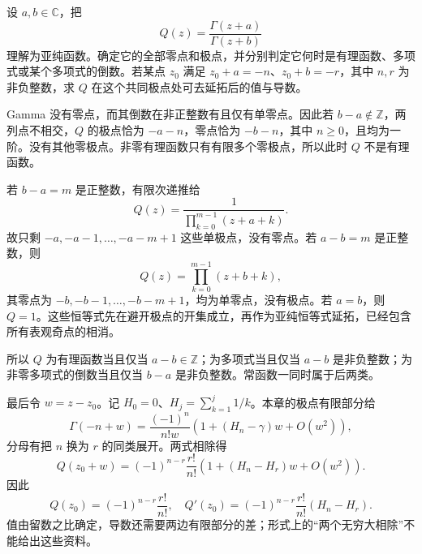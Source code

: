 \begin{exercise}\label{b3:ex:21-3}
设 \(a,b\in\mathbb C\)，把
\[
 Q(z)=\frac{\Gamma(z+a)}{\Gamma(z+b)}
\]
理解为亚纯函数。确定它的全部零点和极点，并分别判定它何时是有理函数、多项式或某个多项式的倒数。若某点 \(z_0\) 满足
\(z_0+a=-n\)、\(z_0+b=-r\)，其中 \(n,r\) 为非负整数，求 \(Q\) 在这个共同极点处可去延拓后的值与导数。
\end{exercise}
\begin{solution}
Gamma 没有零点，而其倒数在非正整数有且仅有单零点。因此若 \(b-a\notin\mathbb Z\)，两列点不相交，\(Q\) 的极点恰为 \(-a-n\)，零点恰为 \(-b-n\)，其中 \(n\ge0\)，且均为一阶。没有其他零极点。非零有理函数只有有限多个零极点，所以此时 \(Q\) 不是有理函数。

若 \(b-a=m\) 是正整数，有限次递推给
\[
 Q(z)=\frac1{\prod_{k=0}^{m-1}(z+a+k)}.
\]
故只剩 \(-a,-a-1,\ldots,-a-m+1\) 这些单极点，没有零点。若 \(a-b=m\) 是正整数，则
\[
 Q(z)=\prod_{k=0}^{m-1}(z+b+k),
\]
其零点为 \(-b,-b-1,\ldots,-b-m+1\)，均为单零点，没有极点。若 \(a=b\)，则 \(Q=1\)。这些恒等式先在避开极点的开集成立，再作为亚纯恒等式延拓，已经包含所有表观奇点的相消。

所以 \(Q\) 为有理函数当且仅当 \(a-b\in\mathbb Z\)；为多项式当且仅当 \(a-b\) 是非负整数；为非零多项式的倒数当且仅当 \(b-a\) 是非负整数。常函数一同时属于后两类。

最后令 \(w=z-z_0\)。记 \(H_0=0\)、\(H_j=\sum_{k=1}^j1/k\)。本章的极点有限部分给
\[
 \Gamma(-n+w)=\frac{(-1)^n}{n!w}
 \left(1+(H_n-\gamma)w+O(w^2)\right),
\]
分母有把 \(n\) 换为 \(r\) 的同类展开。两式相除得
\[
 Q(z_0+w)=(-1)^{n-r}\frac{r!}{n!}
 \left(1+(H_n-H_r)w+O(w^2)\right).
\]
因此
\[
 Q(z_0)=(-1)^{n-r}\frac{r!}{n!},\quad
 Q'(z_0)=(-1)^{n-r}\frac{r!}{n!}(H_n-H_r).
\]
值由留数之比确定，导数还需要两边有限部分的差；形式上的“两个无穷大相除”不能给出这些资料。
\end{solution}

